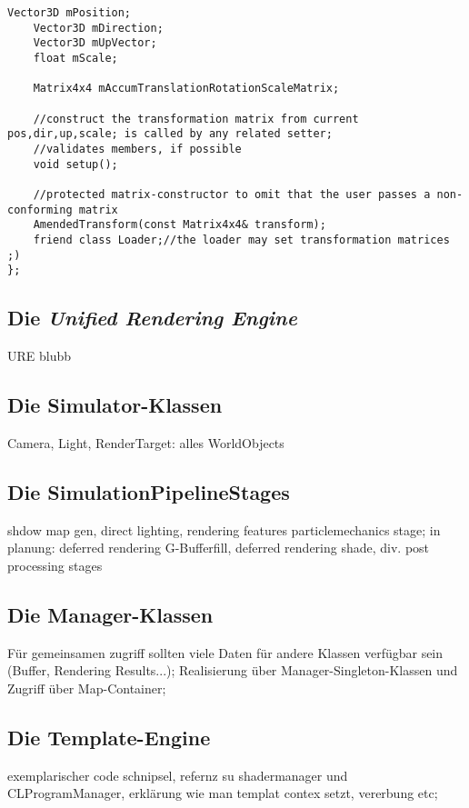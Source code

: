 \begin{lstlisting}[caption={AmenededTransform Klassendefinition, gekürzt},label=listing:AmendedTransformDef]
	Vector3D mPosition;
	Vector3D mDirection;
	Vector3D mUpVector;
	float mScale;
	
	Matrix4x4 mAccumTranslationRotationScaleMatrix;

	//construct the transformation matrix from current pos,dir,up,scale; is called by any related setter;
	//validates members, if possible
	void setup();

	//protected matrix-constructor to omit that the user passes a non-conforming matrix	
	AmendedTransform(const Matrix4x4& transform);
	friend class Loader;//the loader may set transformation matrices ;)
};
 	\end{lstlisting}
    	
    	
    	
\subsection{Die \emph{Unified Rendering Engine}}
URE blubb

\subsection{Die Simulator-Klassen}

	Camera, Light, RenderTarget: alles WorldObjects


\subsection{Die SimulationPipelineStages}
	shdow map gen, direct lighting, rendering features particlemechanics stage;
	in planung: deferred rendering G-Bufferfill, deferred rendering shade, div. post processing stages


\subsection{Die Manager-Klassen}
Für gemeinsamen zugriff sollten viele Daten für andere Klassen verfügbar sein (Buffer, Rendering Results...); 	
Realisierung über Manager-Singleton-Klassen und Zugriff über Map-Container;

\subsection{Die Template-Engine}
	\label{sec:architecture:templateEngine}
	exemplarischer code schnipsel, refernz su shadermanager und CLProgramManager, erklärung wie man templat contex setzt, 	
	vererbung etc;
    	
